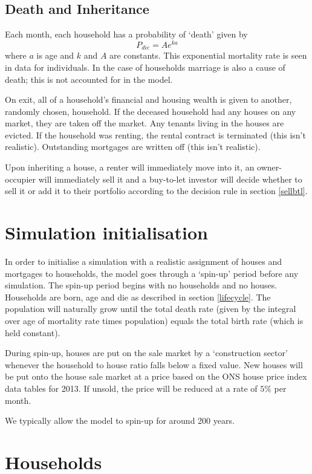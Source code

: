 \documentclass{report}
\begin{document}
\subsection{Death and Inheritance}
Each month, each household has a probability of `death' given by
\begin{equation}
P_{die} = Ae^{ka}
\label{mortality}
\end{equation}
where $a$ is age and $k$ and $A$ are constants. This exponential mortality rate is seen in data for individuals. In the case of households marriage is also a cause of death; this is not accounted for in the model.

On exit, all of a household's financial and housing wealth is given to another, randomly chosen, household. If the deceased household had any houses on any market, they are taken off the market. Any tenants living in the houses are evicted. If the household was renting, the rental contract is terminated (this isn't realistic). Outstanding mortgages are written off (this isn't realistic).

Upon inheriting a house, a renter will immediately move into it, an owner-occupier will immediately sell it and a buy-to-let investor will decide whether to sell it or add it to their portfolio according to the decision rule in section \ref{sellbtl}.
 
\section{Simulation initialisation}
In order to initialise a simulation with a realistic assignment of houses and mortgages to households, the model goes through a `spin-up' period before any simulation. The spin-up period begins with no households and no houses. Households are born, age and die as described in section \ref{lifecycle}. The population will naturally grow until the total death rate (given by the integral over age of mortality rate times population) equals the total birth rate (which is held constant).

During spin-up, houses are put on the sale market by a `construction sector' whenever the household to house ratio falls below a fixed value. New houses will be put onto the house sale market at a price based on the ONS house price index data tables for 2013. If unsold, the price will be reduced at a rate of $5\%$ per month.

We typically allow the model to spin-up for around 200 years.

\section{Households}
\end{document}
